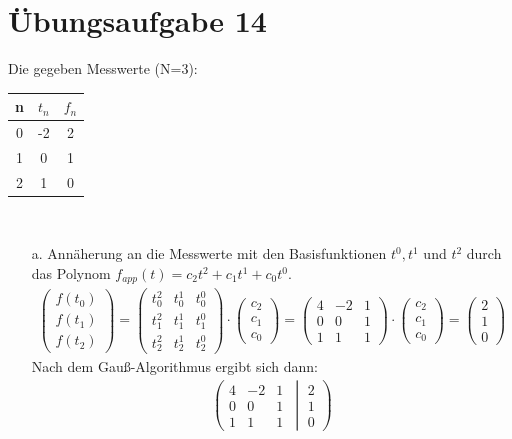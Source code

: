     \section*{Übungsaufgabe 14}
    Die gegeben Messwerte (N=3):\\
    \begin{tabular}{|c| c| c|}
    	\hline
		\textbf{n}	&	\textbf{$t_n$}	&	\textbf{$f_n$}\\
		\hline
		0	&	-2	&	2\\
		1	&	0	&	1\\
		2	&	1	&	0\\
		\hline
    \end{tabular}\\
	\begin{itemize}
		\item[a.] Annäherung an die Messwerte mit den Basisfunktionen $t^0,t^1$ und $t^2$ durch das Polynom $f_{app}(t) = c_2t^2 + c_1t^1 + c_0t^0$.
		\begin{align*}
			\left(\begin{matrix}f(t_0) \\ f(t_1) \\ f(t_2) \end{matrix}\right)
			= \left(\begin{matrix} t_0^2 & t_0^1 & t_0^0\\t_1^2 & t_1^1 & t_1^0\\t_2^2 & t_2^1 & t_2^0\end{matrix}\right)\cdot\left(\begin{matrix}c_2\\c_1\\c_0\end{matrix}\right)
			= \left(\begin{matrix} 4 & -2 & 1\\0 & 0 & 1\\ 1 & 1 & 1\end{matrix}\right)\cdot\left(\begin{matrix}c_2\\c_1\\c_0\end{matrix}\right) = \left(\begin{matrix}2 \\ 1 \\ 0 \end{matrix}\right)
		\end{align*}
		Nach dem Gauß-Algorithmus ergibt sich dann:
		\begin{align*}
			\left(\left.\begin{matrix} 4 & -2 & 1\\0 & 0 & 1\\ 1 & 1 & 1\end{matrix}\ \ \right|\ \begin{matrix}2 \\ 1 \\ 0 \end{matrix}\right)

\end{align*}
\end{itemize}
